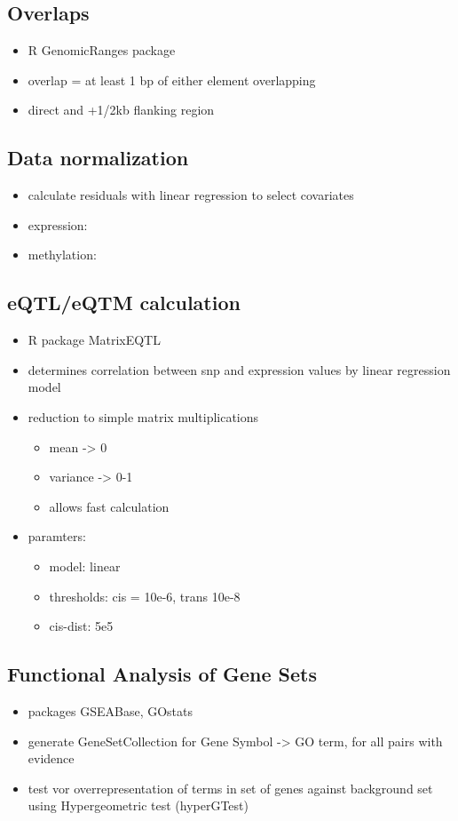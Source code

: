 \documentclass[a4paper,12pt]{article}
\begin{document}
\subsection{Overlaps}
\begin{itemize}
\item R GenomicRanges package
\item overlap = at least 1 bp of either element overlapping
\item direct and +1/2kb flanking region
\end{itemize}
\subsection{Data normalization}
\begin{itemize}
\item calculate residuals with linear regression to select covariates
\item expression: 
\item methylation:
\end{itemize}
\subsection{eQTL/eQTM calculation}
\begin{itemize}
\item R package MatrixEQTL
\item determines correlation between snp and expression values by linear regression model
\item reduction to simple matrix multiplications
\begin{itemize}
\item mean -> 0
\item variance -> 0-1
\item allows fast calculation
\end{itemize}
\item paramters: 
\begin{itemize}
\item model: linear
\item thresholds: cis = 10e-6, trans 10e-8
\item cis-dist: 5e5
\end{itemize}
\end{itemize}
\subsection{Functional Analysis of Gene Sets}
\begin{itemize}
\item packages GSEABase, GOstats
\item generate GeneSetCollection for Gene Symbol -> GO term, for all pairs with evidence
\item test vor overrepresentation of terms in set of genes against background set using Hypergeometric test (hyperGTest)
\end{itemize}
\end{document}
